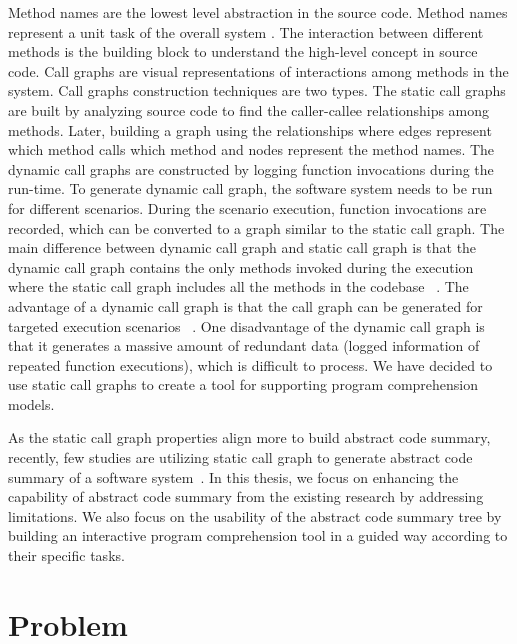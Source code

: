 Method names are the lowest level abstraction in the source code. Method names represent a unit task of the overall system \cite{de2012IRMethodsArtifacts, starke2009searching}. The interaction between different methods is the building block to understand the high-level concept in source code. Call graphs are visual representations of interactions among methods in the system. Call graphs construction techniques are two types. The static call graphs are built by analyzing source code to find the caller-callee relationships among methods. Later, building a graph using the relationships where edges represent which method calls which method and nodes represent the method names. The dynamic call graphs are constructed by logging function invocations during the run-time. To generate dynamic call graph, the software system needs to be run for different scenarios. During the scenario execution, function invocations are recorded, which can be converted to a graph similar to the static call graph. The main difference between dynamic call graph and static call graph is that the dynamic call graph contains the only methods invoked during the execution where the static call graph includes all the methods in the codebase ~\cite{gharibi2018automaticStaticCluster}. The advantage of a dynamic call graph is that the call graph can be generated for targeted execution scenarios ~\cite{feng2018hierarchicalExecutionComprehension}. One disadvantage of the dynamic call graph is that it generates a massive amount of redundant data (logged information of repeated function executions), which is difficult to process. We have decided to use static call graphs to create a tool for supporting program comprehension models. 

As the static call graph properties align more to build abstract code summary, recently, few studies are utilizing static call graph to generate abstract code summary of a software system~\cite{gharibi2018automaticStaticCluster, walunj2019graphevoEvolutionCall}. In this thesis, we focus on enhancing the capability of abstract code summary from the existing research by addressing limitations. We also focus on the usability of the abstract code summary tree by building an interactive program comprehension tool
in a guided way according to their specific tasks. 
 
\newpage


\section{Problem }
\label{intro:problem}

